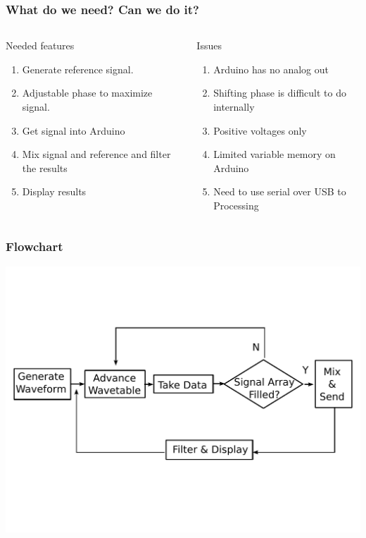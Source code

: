 \documentclass{beamer}
\begin{document}
\begin{frame}
\frametitle{What do we need? Can we do it?}
\begin{columns}
\begin{block}{Needed features}
\begin{enumerate}

\item {Generate reference signal.}
\item {Adjustable phase to maximize signal.}
\item {Get signal into Arduino}
\item {Mix signal and reference and filter the results}
\item {Display results}
\end{enumerate}
\end{block}
\pause
{}
\begin{block}{Issues}
\begin{enumerate}[<+->]
\item{Arduino has no analog out}
\item{Shifting phase is difficult to do internally}
\item{Positive voltages only}
\item{Limited variable memory on Arduino}
\item{Need to use serial over USB to Processing}
\end{enumerate}
\end{block}
\end{columns}
\end{frame}


\begin{frame}
\frametitle{Flowchart}
\includegraphics[scale=.5]{PSD_flowchart1}
\end{frame}
\end{document}
